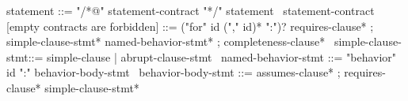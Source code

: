 \begin{syntax}
  statement ::= "/*@" statement-contract "*/" statement
  \
  statement-contract [empty contracts are forbidden] ::= ("for" id ("," id)* ":")? requires-clause* ;
    simple-clause-stmt* named-behavior-stmt* ;
    completeness-clause*
  \
  simple-clause-stmt::= simple-clause | abrupt-clause-stmt
  \
  named-behavior-stmt ::= "behavior" id ":" behavior-body-stmt
  \
  behavior-body-stmt ::= assumes-clause* ;
       requires-clause* simple-clause-stmt*
\end{syntax}
